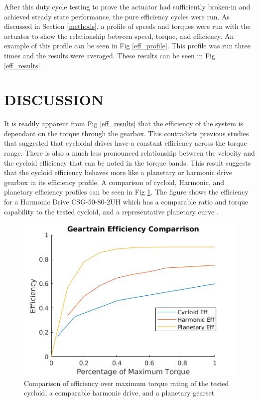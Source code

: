 \documentclass[letterpaper, 10 pt, conference]{ieeeconf}  %
\begin{document}
After this duty cycle testing to prove the actuator had sufficiently broken-in and achieved steady state performance, the pure efficiency cycles were run. As discussed in Section \ref{methods}, a profile of speeds and torques were run with the actuator to show the relationship between speed, torque, and efficiency. An example of this profile can be seen in Fig \ref{eff_profile}. This profile was run three times and the results were averaged. These results can be seen in Fig \ref{eff_results}. 

\section{DISCUSSION} \label{discussion}

It is readily apparent from Fig \ref{eff_results} that the efficiency of the system is dependant on the torque through the gearbox. This contradicts previous studies that suggested that cycloidal drives have a constant efficiency across the torque range. There is also a much less pronounced relationship between the velocity and the cycloid efficiency that can be noted in the torque bands. This result suggests that the cycloid efficiency behaves more like a planetary or harmonic drive gearbox in its efficiency profile. A comparison of cycloid, Harmonic, and planetary efficiency profiles can be seen in Fig \ref{eff_comp}. The figure shows the efficiency for a Harmonic Drive CSG-50-80-2UH \cite{harmonic_sheet} which has a comparable ratio and torque capability to the tested cycloid, and a representative planetary curve \cite{planetary}. 

   \begin{figure}[!b]
      \centering
      \includegraphics[width=\linewidth]{eff_comp_v1}
      \caption{Comparison of efficiency over maximum torque rating of the tested cycloid, a comparable harmonic drive, and a planetary gearset}
      \label{eff_comp}
   \end{figure}
   
\end{document}
